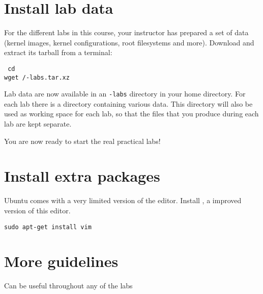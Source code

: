 
\section{Install lab data}

For the different labs in this course, your instructor has prepared a
set of data (kernel images, kernel configurations, root filesystems
and more). Download and extract its tarball from a terminal:


{\scriptsize
{\tt
cd \\
wget \sessionurl/\longname-labs.tar.xz \\
}
}

Lab data are now available in an {\tt \longname-labs} directory in
your home directory. For each lab there is a directory containing
various data. This directory will also be used as working space for
each lab, so that the files that you produce during each lab are kept
separate.

You are now ready to start the real practical labs!

\section{Install extra packages}

Ubuntu comes with a very limited version of the 
editor. Install , a improved version of this editor.

\begin{verbatim}
sudo apt-get install vim
\end{verbatim}

\section{More guidelines}

Can be useful throughout any of the labs

